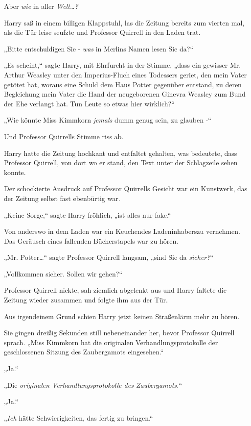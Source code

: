 {Aber \emph{wie} in aller \emph{Welt…?}

Harry saß in einem billigen Klappstuhl, las die Zeitung bereits zum vierten mal, als die Tür leise seufzte und Professor Quirrell in den Laden trat.

„Bitte entschuldigen Sie - \emph{was} in Merlins Namen lesen Sie da?“

„Es scheint,“ sagte Harry, mit Ehrfurcht in der Stimme, „dass ein gewisser Mr. Arthur Weasley unter den Imperius-Fluch eines Todessers geriet, den mein Vater getötet hat, woraus eine Schuld dem Haus Potter gegenüber entstand, zu deren Begleichung mein Vater die Hand der neugeborenen Ginevra Weasley zum Bund der Ehe verlangt hat. Tun Leute so etwas hier wirklich?“

„Wie könnte Miss Kimmkorn \emph{jemals} dumm genug sein, zu glauben -“

Und Professor Quirrells Stimme riss ab.

Harry hatte die Zeitung hochkant und entfaltet gehalten, was bedeutete, dass Professor Quirrell, von dort wo er stand, den Text unter der Schlagzeile sehen konnte.

Der schockierte Ausdruck auf Professor Quirrells Gesicht war ein Kunstwerk, das der Zeitung selbst fast ebenbürtig war.

„Keine Sorge,“ sagte Harry fröhlich, „ist alles nur fake.“

Von anderswo in dem Laden war ein Keuchendes Ladeninhaberszu vernehmen. Das Geräusch eines fallenden Bücherstapels war zu hören.

„Mr. Potter…“ sagte Professor Quirrell langsam, „sind Sie da \emph{sicher?}“

„Vollkommen sicher. Sollen wir gehen?“

Professor Quirrell nickte, sah ziemlich abgelenkt aus und Harry faltete die Zeitung wieder zusammen und folgte ihm aus der Tür.

Aus irgendeinem Grund schien Harry jetzt keinen Straßenlärm mehr zu hören.

Sie gingen dreißig Sekunden still nebeneinander her, bevor Professor Quirrell sprach. „Miss Kimmkorn hat die originalen Verhandlungsprotokolle der geschlossenen Sitzung des Zaubergamots eingesehen.“

„Ja.“

„Die \emph{originalen Verhandlungsprotokolle des Zaubergamots.}“

„Ja.“

„\emph{Ich} hätte Schwierigkeiten, das fertig zu bringen.“

}

